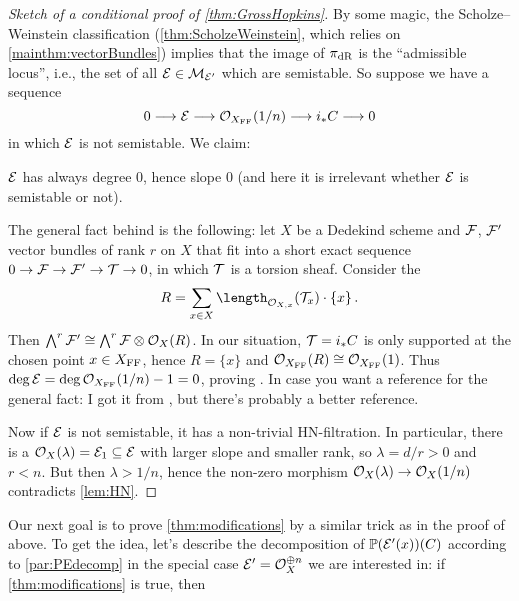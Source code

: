 \documentclass[a4paper, 10pt, oneside, DIV=9, chapterprefix=true, numbers=enddot,bibliography=totoc]{scrbook}
\begin{document}
\begin{proof}[Sketch of a conditional proof of \cref{thm:GrossHopkins}]
	By some magic, the Scholze--Weinstein classification (\cref{thm:ScholzeWeinstein}, which relies on \cref{mainthm:vectorBundles}) implies that the image of $\pi_{\mathrm{dR}}$ is the \enquote{admissible locus}, i.e., the set of all $\mathcal{E}\in \mathcal{M}_{\mathcal{E}'}$ which are semistable. So suppose we have a sequence 
	\begin{equation*}
		0\morphism \Ee\morphism \Oo_{X_\FFC}(1/n)\morphism i_*C\morphism 0
	\end{equation*}
	in which $\mathcal{E}$ is not semistable. We claim:
	\begin{alphanumerate}
		\item[\itememph{*}] $\mathcal{E}$ has always degree $0$, hence slope $0$ (and here it is irrelevant whether $\mathcal{E}$ is semistable or not).
	\end{alphanumerate}
	The general fact behind \itememph{*} is the following: let $X$ be a Dedekind scheme and $\mathcal{F}$, $\mathcal{F}'$ vector bundles of rank $r$ on $X$ that fit into a short exact sequence $0\morphism \Ff\morphism\Ff'\morphism \Tt\morphism 0$, in which $\mathcal{T}$ is a torsion sheaf. Consider the 
	\begin{equation*}
		R=\sum_{x\in X}\length_{\Oo_{X,x}}(\Tt_x)\cdot \{x\}\,.
	\end{equation*}
	Then $\bigwedge^r\mathcal{F}'\cong \bigwedge^r\mathcal{F}\otimes \mathcal{O}_X(R)$. In our situation, $\mathcal{T}=i_*C$ is only supported at the chosen point $x\in X_{\mathrm{FF}}$, hence $R=\{x\}$ and $\mathcal{O}_{X_{\mathrm{FF}}}(R)\cong\mathcal{O}_{X_{\mathrm{FF}}}(1)$. Thus $\deg \mathcal{E}=\deg \mathcal{O}_{X_{\mathrm{FF}}}(1/n)-1=0$, proving \itememph{*}. In case you want a reference for the general fact: I got it from \cite[Lemma~11]{AlternativeSerreDuality}, but there's probably a better reference.
	
	Now if $\mathcal{E}$ is not semistable, it has a non-trivial HN-filtration. In particular, there is a $\mathcal{O}_X(\lambda)=\mathcal{E}_1\subseteq \mathcal{E}$ with larger slope and smaller rank, so $\lambda=d/r>0$ and $r<n$. But then $\lambda>1/n$, hence the non-zero morphism $\Oo_X(\lambda)\morphism\Oo_X(1/n)$ contradicts \cref{lem:HN}.
\end{proof}
\numpar{}\label{par:motivation}Our next goal is to prove \cref{thm:modifications} by a similar trick as in the proof of  above. To get the idea, let's describe the decomposition of $\mathbb{P}(\mathcal{E}'(x))(C)$ according to \cref{par:PEdecomp} in the special case $\mathcal{E}'=\mathcal{O}_X^{\oplus n}$ we are interested in: if \cref{thm:modifications} is true, then
\end{document}
